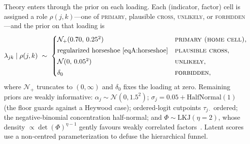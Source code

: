 Theory enters through the prior on each loading. Each (indicator, factor) cell is
assigned a role $\rho(j,k)$---one of \textsc{primary}, plausible \textsc{cross},
\textsc{unlikely}, or \textsc{forbidden}---and the prior on that loading is
\begin{equation}
  \lambda_{jk}\mid\rho(j,k)\ \sim\
  \begin{cases}
    \mathcal{N}_{+}(0.70,\,0.25^2) & \textsc{primary (home cell)},\\[2pt]
    \text{regularized horseshoe } \eqref{eqA:horseshoe} & \textsc{plausible cross},\\[2pt]
    \mathcal{N}(0,\,0.05^2)        & \textsc{unlikely},\\[2pt]
    \delta_{0}                     & \textsc{forbidden},
  \end{cases}
  \label{eqA:softprior}
\end{equation}
where $\mathcal{N}_{+}$ truncates to $(0,\infty)$ and $\delta_0$ fixes the loading at
zero. Remaining priors are weakly informative: $\alpha_j\sim\mathcal{N}(0,1.5^2)$;
$\sigma_j=0.05+\mathrm{HalfNormal}(1)$ (the floor guards against a Heywood case);
ordered-logit cutpoints $\tau_{j\cdot}$ ordered; the negative-binomial concentration
half-normal; and $\Phi\sim\mathrm{LKJ}(\eta{=}2)$, whose density
$\propto\det(\Phi)^{\eta-1}$ gently favours weakly correlated
factors~\citep{lewandowski2009lkj}. Latent scores use a non-centred parameterization to
defuse the hierarchical funnel.

